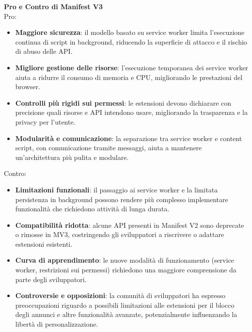 \textbf{Pro e Contro di Manifest V3}\\
Pro:
\begin{itemize}
    \item \textbf{Maggiore sicurezza}: il modello basato su service worker limita l’esecuzione continua di script in background, riducendo la superficie di attacco e il rischio di abuso delle API.
    \item \textbf{Migliore gestione delle risorse}: l’esecuzione temporanea dei service worker aiuta a ridurre il consumo di memoria e CPU, migliorando le prestazioni del browser.
    \item \textbf{Controlli più rigidi sui permessi}: le estensioni devono dichiarare con precisione quali risorse e API intendono usare, migliorando la trasparenza e la privacy per l’utente.
    \item \textbf{Modularità e comunicazione}: la separazione tra service worker e content script, con comunicazione tramite messaggi, aiuta a mantenere un’architettura più pulita e modulare.
\end{itemize}

Contro:
\begin{itemize}
    \item \textbf{Limitazioni funzionali}: il passaggio ai service worker e la limitata persistenza in background possono rendere più complesso implementare funzionalità che richiedono attività di lunga durata.
    \item \textbf{Compatibilità ridotta}: alcune API presenti in Manifest V2 sono deprecate o rimosse in MV3, costringendo gli sviluppatori a riscrivere o adattare estensioni esistenti.
    \item \textbf{Curva di apprendimento}: le nuove modalità di funzionamento (service worker, restrizioni sui permessi) richiedono una maggiore comprensione da parte degli sviluppatori.
    \item \textbf{Controversie e opposizioni}: la comunità di sviluppatori ha espresso preoccupazioni riguardo a possibili limitazioni alle estensioni per il blocco degli annunci e altre funzionalità avanzate, potenzialmente influenzando la libertà di personalizzazione.
\end{itemize}

